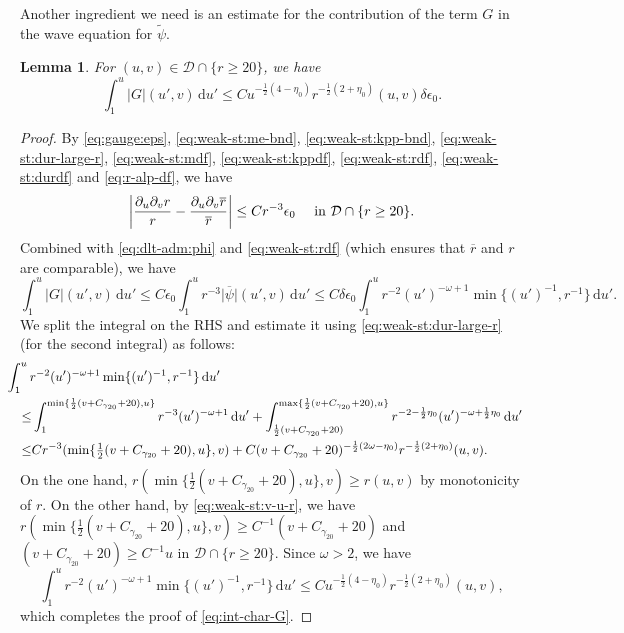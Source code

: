 \documentclass[10pt, reqno]{amsart}
\newtheorem{lemma}[theorem]{Lemma}
\theoremstyle{definition}
\theoremstyle{remark}
\theoremstyle{conjecture}
\numberwithin{equation}{section}
\newcommand{\abs}[1]{\vert#1\vert}
\newcommand{\set}[1]{\{#1\}}
\newcommand{\ud}{\mathrm{d}}
\newcommand{\rd}{\partial}
\newcommand{\0}{\emptyset}
\newcommand{\gmm}{\gamma}
\newcommand{\dlt}{\delta}
\newcommand{\eps}{\epsilon}
\newcommand{\omg}{\omega}
\newcommand{\calD}{\mathcal D}
\newcommand{\psibg}{\overline{\psi}}				%
\newcommand{\rbg}{\overline{r}}					%
\newcommand{\psidf}{\widetilde{\psi}}				%
\newcommand{\Abs}[1]{\left\vert #1 \right\vert}
\begin{document}
Another ingredient we need is an estimate for the contribution of the term $G$ in the wave equation for $\psidf$.
\begin{lemma} \label{lem:int-char-G}
For $(u, v) \in \calD \cap \set{r \geq 20}$, we have
\begin{equation} \label{eq:int-char-G}
	\int_{1}^{u} \abs{G} (u', v) \, \ud u' \leq C u^{-\frac{1}{2} (4-\eta_{0})} r^{-\frac{1}{2}(2+\eta_{0})}  (u, v) \dlt \eps_{0}.
\end{equation}
\end{lemma}
\begin{proof}
By \eqref{eq:gauge:eps}, \eqref{eq:weak-st:me-bnd}, \eqref{eq:weak-st:kpp-bnd}, \eqref{eq:weak-st:dur-large-r}, \eqref{eq:weak-st:mdf}, \eqref{eq:weak-st:kppdf}, \eqref{eq:weak-st:rdf}, \eqref{eq:weak-st:durdf} and \eqref{eq:r-alp-df}, we have
\begin{equation*}
	\Abs{\frac{\rd_{u} \rd_{v} r}{r} -  \frac{\rd_{u} \rd_{v} \rbg}{\rbg}} \leq C r^{-3} \eps_{0} \quad \hbox{ in } \calD \cap \set{r \geq 20}.
\end{equation*}
Combined with \eqref{eq:dlt-adm:phi} and \eqref{eq:weak-st:rdf} (which ensures that $\rbg$ and $r$ are comparable), we have
\begin{equation*}
	\int_{1}^{u} \abs{G}(u', v) \, \ud u'
	\leq C \eps_{0} \int_{1}^{u} r^{-3} \abs{\psibg} (u', v) \, \ud u' 
	\leq C \dlt \eps_{0} \int_{1}^{u} r^{-2} (u')^{-\omg + 1} \min \set{(u')^{-1}, r^{-1}} \, \ud u'.
\end{equation*}
We split the integral on the RHS and estimate it using \eqref{eq:weak-st:dur-large-r} (for the second integral) as follows:
\begin{align*}
& \hskip-2em
\int_{1}^{u} r^{-2} (u')^{-\omg + 1} \min \set{(u')^{-1}, r^{-1}} \, \ud u' \\
\leq & \int_{1}^{\min \set{\frac{1}{2}(v+C_{\gmm_{20}}+20), u}} r^{-3} (u')^{-\omg + 1} \, \ud u' 
 + \int_{\frac{1}{2}(v+C_{\gmm_{20}}+20)}^{\max \set{\frac{1}{2}(v+C_{\gmm_{20}}+20), u}} r^{-2 - \frac{1}{2} \eta_{0}} (u')^{-\omg + \frac{1}{2}\eta_{0}}  \, \ud u' \\
\leq & C r^{-3}(\min\set{\tfrac{1}{2}(v+C_{\gmm_{20}}+20), u}, v) + C (v+C_{\gmm_{20}}+20)^{-\frac{1}{2} (2\omg -\eta_{0})} r^{-\frac{1}{2}(2+\eta_{0})} (u,v).
\end{align*}
On the one hand, $r(\min\set{\tfrac{1}{2}(v+C_{\gmm_{20}}+20), u}, v) \geq r(u, v)$ by monotonicity of $r$. On the other hand, by \eqref{eq:weak-st:v-u-r}, we have $r(\min\set{\tfrac{1}{2}(v+C_{\gmm_{20}}+20), u}, v) \geq C^{-1} (v+C_{\gmm_{20}} + 20)$ and $(v+C_{\gmm_{20}} + 20) \geq C^{-1} u$ in $\calD \cap \set{r \geq 20}$. Since $\omg > 2$, we have
\begin{equation*}
\int_{1}^{u} r^{-2} (u')^{-\omg + 1} \min \set{(u')^{-1}, r^{-1}} \, \ud u' 
\leq C u^{-\frac{1}{2} (4-\eta_{0})} r^{-\frac{1}{2} (2+\eta_{0})}(u, v),
\end{equation*}
which completes the proof of \eqref{eq:int-char-G}. \qedhere
\end{proof}
\end{document}
